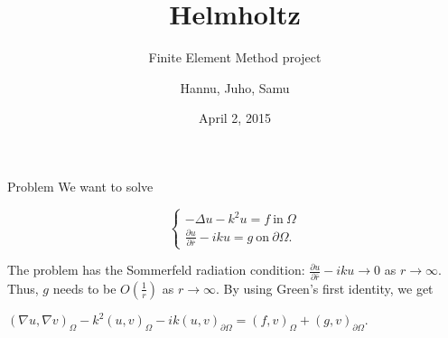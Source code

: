 \documentclass{beamer}
\title[Helmholtz]{Helmholtz}
\subtitle{Finite Element Method project}
\author{Hannu, Juho, Samu}
\date{April 2, 2015}
\begin{document}
\begin{frame}
\titlepage
\end{frame}

\begin{frame}{Problem}
We want to solve
\begin{definition}
\[ \begin{cases}
-\Delta u - k^2 u = f \ \mathrm{in} \ \Omega \\ \frac{\partial u}{\partial \bar{r}} - iku = g \ \mathrm{on} \ \partial \Omega.
\end{cases} \]
\end{definition}
The problem has the Sommerfeld radiation condition: $\frac{\partial u}{\partial \bar{r}} - iku \rightarrow 0$ as $r \rightarrow \infty$. Thus, $g$ needs to be $O(\frac{1}{r})$ as $r \rightarrow \infty$.
By using Green's first identity, we get \begin{definition}$(\nabla u, \nabla v)_{\Omega} - k^2(u, v)_{\Omega} - ik(u, v)_{\partial \Omega} = (f, v)_{\Omega} + (g, v)_{\partial \Omega}.$
\end{definition}
\end{frame}
\end{document}
